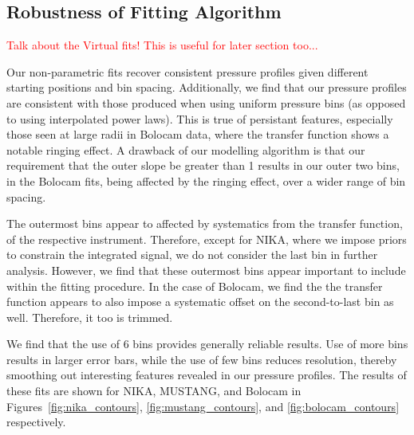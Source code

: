 \documentclass[iop,numberedappendix,apj]{emulateapj}
\begin{document}

\subsection{Robustness of Fitting Algorithm}
\label{sec:robustness}

\textcolor{red}{Talk about the Virtual fits! This is useful for later section too...}

Our non-parametric fits recover consistent pressure profiles given different starting positions and bin spacing.
Additionally, we find that our pressure profiles are consistent with those produced when using uniform pressure
bins (as opposed to using interpolated power laws). This is true of persistant features, especially those seen
at large radii in Bolocam data, where the transfer function shows a notable ringing effect. A drawback of our
modelling algorithm is that our requirement that the outer slope be greater than 1 results in our outer two bins,
in the Bolocam fits, being affected by the ringing effect, over a wider range of bin spacing. 

The outermost bins appear to affected by systematics from the transfer function, of the respective instrument.
Therefore, except for NIKA, where we impose priors to constrain the integrated signal, we do not consider the
last bin in further analysis. However, we find that these outermost bins appear important to include within the
fitting procedure. In the case of Bolocam, we find the the transfer function appears to also impose a systematic
offset on the second-to-last bin as well. Therefore, it too is trimmed.

We find that the use of 6 bins provides generally reliable results. Use of more bins results in larger error bars, while
the use of few bins reduces resolution, thereby smoothing out interesting features revealed in our pressure profiles.
The results of these fits are shown for NIKA, MUSTANG, and Bolocam in Figures~\ref{fig:nika_contours},
\ref{fig:mustang_contours},
and \ref{fig:bolocam_contours} respectively.
\end{document}
